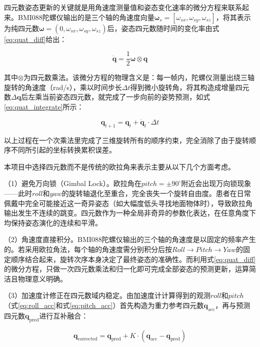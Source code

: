 四元数姿态更新的关键就是用角速度测量值和姿态变化速率的微分方程来联系起来。BMI088陀螺仪输出的是三个轴的角速度向量$\boldsymbol{\omega}_s = [\omega_{sx}, \omega_{sy}, \omega_{sz}]$，将其表示为纯四元数$\boldsymbol{\omega} = (0, \omega_{sx}, \omega_{sy}, \omega_{sz})$后，姿态四元数随时间的变化率由式\ref{eq:quat_diff}给出：

\begin{equation}
\dot{\mathbf{q}} = \frac{1}{2} \boldsymbol{\omega} \otimes \mathbf{q}
\label{eq:quat_diff}
\end{equation}

其中$\otimes$为四元数乘法。该微分方程的物理含义是：每一帧内，陀螺仪测量出绕三轴旋转的角速度（rad/s），乘以时间步长$\Delta t$得到微小旋转角，将其构造成增量四元数$\Delta\mathbf{q}$后左乘当前姿态四元数，就完成了一步向前的姿势预测，如式\ref{eq:quat_integrate}所示：

\begin{equation}
\mathbf{q}_{t+1} = \mathbf{q}_t + \dot{\mathbf{q}}_t \cdot \Delta t
\label{eq:quat_integrate}
\end{equation}

以上过程在一个次乘法里完成了三维旋转所有的顺序约束，完全消除了由于旋转顺序不同所引起的坐标转换累积误差。

本项目中选择四元数而不是传统的欧拉角来表示主要从以下几个方面考虑。

（1）避免万向锁（Gimbal Lock）。欧拉角在$pitch = \pm 90^\circ$附近会出现万向锁现象——此时$roll$和$yaw$的旋转轴退化至重合，完全丧失一个旋转自由度。患者在日常佩戴中完全可能接近这一奇异姿态（如大幅度低头寻找地面物体时），导致欧拉角输出发生不连续的跳变。四元数作为一种全局非奇异的参数化表达，在任意角度下均保持姿态演化的连续和平滑。

（2）角速度直接积分。BMI088陀螺仪输出的三个轴的角速度是以固定的频率产生的。若采用欧拉角法，每个轴的角速度需分别积分后按$Roll \rightarrow Pitch \rightarrow Yaw$的固定顺序结合起来，旋转次序本身决定了最终姿态的准确性。而利用式\ref{eq:quat_diff}的微分方程，只做一次四元数乘法和归一化即可完成全部姿态的预测更新，运算简洁且物理意义明确。

（3）加速度计修正在四元数域内稳定。由加速度计计算得到的观测$roll$和$pitch$（式\ref{eq:roll_acc}和式\ref{eq:pitch_acc}）首先构造为重力参考四元数$\mathbf{q}_{\text{acc}}$，再与预测四元数$\mathbf{q}_{\text{pred}}$进行互补融合：

\begin{equation}
\mathbf{q}_{\text{corrected}} = \mathbf{q}_{\text{pred}} + K \cdot (\mathbf{q}_{\text{acc}} - \mathbf{q}_{\text{pred}})
\label{eq:quat_correct}
\end{equation}

